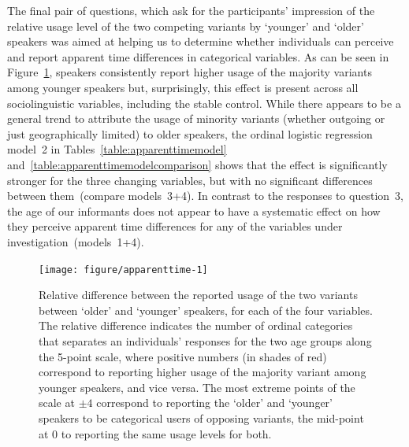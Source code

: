 The final pair of questions, which ask for the participants' impression of the relative usage level of the two competing variants by `younger' and `older' speakers was aimed at helping us to determine whether individuals can perceive and report apparent time differences in categorical variables. As can be seen in Figure~\ref{fig:apparenttime}, speakers consistently report higher usage of the majority variants among younger speakers but, surprisingly, this effect is present across all sociolinguistic variables, including the stable control.
While there appears to be a general trend to attribute the usage of minority variants (whether outgoing or just geographically limited) to older speakers, the ordinal logistic regression model~2 in Tables~\ref{table:apparenttimemodel} and~\ref{table:apparenttimemodelcomparison} shows that the effect is significantly stronger for the three changing variables, but with no significant differences between them~(compare models~3+4).
In contrast to the responses to question~3, the age of our informants does not appear to have a systematic effect on how they perceive apparent time differences for any of the variables under investigation~(models~1+4).

\begin{figure}[htbp]

{\centering \texttt{[image: figure/apparenttime-1]} 

}

\caption[Relative difference between the reported usage of the two variants between `older' and `younger' speakers, for each of the four variables]{Relative difference between the reported usage of the two variants between `older' and `younger' speakers, for each of the four variables. The relative difference indicates the number of ordinal categories that separates an individuals' responses for the two age groups along the 5-point scale, where positive numbers (in shades of red) correspond to reporting higher usage of the majority variant among younger speakers, and vice versa. The most extreme points of the scale at $\pm4$ correspond to reporting the `older' and `younger' speakers to be categorical users of opposing variants, the mid-point at $0$ to reporting the same usage levels for both.}\label{fig:apparenttime}
\end{figure}


